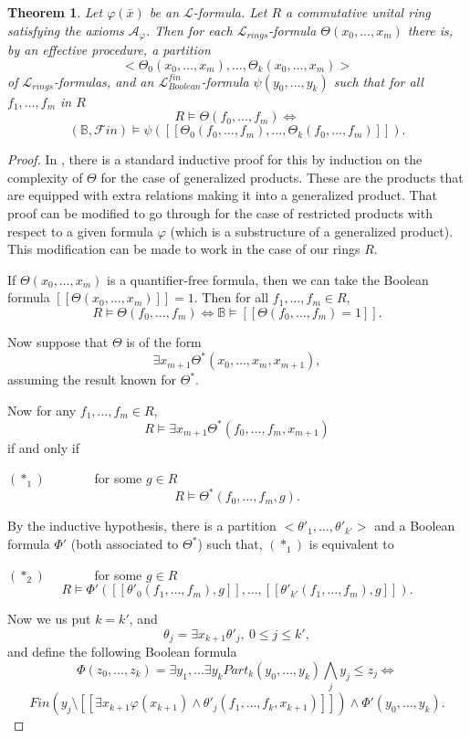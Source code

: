 \documentclass[12pt]{amsart}
\def\B{\mathbb{B}}
\def\cL{\mathcal{L}}
\def\cL{\mathcal{L}}
\def\cA{\mathcal{A}}
\newtheorem{thm}{Theorem}[section]
\numberwithin{equation}{section}
\begin{document}
\begin{thm}\label{main-th} Let $\varphi(\bar x)$ be an $\cL$-formula. Let $R$ a commutative unital ring satisfying the axioms $\cA_{\varphi}$. Then 
for each $\cL_{rings}$-formula $\Theta(x_0,\dots,x_m)$ there is, by an effective procedure, a partition 
$$<\Theta_0(x_0,\dots,x_m),\dots,\Theta_k(x_0,\dots,x_m)>$$ of $\cL_{rings}$-formulas, and an 
$\cL_{Boolean}^{fin}$-formula 
$\psi(y_0,\dots,y_k)$ such that for all $f_1,\dots,f_m$ in $R$
$$R\models \Theta(f_0,\dots,f_m) \Leftrightarrow $$
$$(\B,\mathcal{F}in)\models \psi([[\Theta_0(f_0,\dots,f_m),\dots,\Theta_k(f_0,\dots,f_m)]]).$$\end{thm}
\begin{proof}
In \cite{FV}, there is a standard inductive proof for this by induction on the complexity of $\Theta$ for the case of generalized products. These are the products that are equipped with extra relations making it into a generalized product.  
That proof can be modified to go through for the case of restricted products with respect to a given formula $\varphi$ (which is a substructure of a generalized product). This modification can be made to work in the case of our rings $R$. 

If $\Theta(x_0,\dots,x_m)$ is a quantifier-free formula, then 
we can take the Boolean formula $[[\Theta(x_0,\dots,x_m)]]=1$. Then for all $f_1,\dots,f_m\in R$, 
$$R\models \Theta(f_0,\dots,f_m) \Leftrightarrow \B\models [[\Theta(f_0,\dots,f_m)=1]].$$

Now suppose that $\Theta$ is of the form 
$$\exists x_{m+1} \Theta^*(x_0,\dots,x_m,x_{m+1}),$$
assuming the result known for $\Theta^*$.

Now for any $f_1,\dots,f_m\in R$,
$$R\models \exists x_{m+1} \Theta^*(f_0,\dots,f_m,x_{m+1})$$
if and only if 

$(*_1)$ \ \ \ \ \ \ \ for some $g\in R$
$$R\models \Theta^*(f_0,\dots,f_m,g).$$

By the inductive hypothesis, there is a partition $<\theta'_1,\dots,\theta'_{k'}>$ and a Boolean formula $\Phi'$ (both associated to $\Theta^*$) such that, $(*_1)$ is equivalent to 

$(*_2)$ \ \ \ \ \ \ \ for some $g\in R$
$$R\models \Phi'([[\theta'_0(f_1,\dots,f_m),g]],\dots,[[\theta'_{k'}(f_1,\dots,f_m),g]]).$$

Now we us put $k=k'$, and 
$$\theta_j=\exists x_{k+1} \theta'_j, \ 0\leq j\leq k',$$
and define the following Boolean formula
$$\Phi(z_0,\dots,z_k)=\exists y_1,\dots \exists y_k Part_k(y_0,\dots,y_k) \bigwedge_{j} y_j \leq z_j \Leftrightarrow $$
$$Fin(y_j\setminus [[\exists x_{k+1} \varphi(x_{k+1}) \wedge \theta'_j(f_1,\dots,f_k,x_{k+1})]]) \wedge \Phi'(y_0,\dots,y_k).$$


\end{proof}
\end{document}
